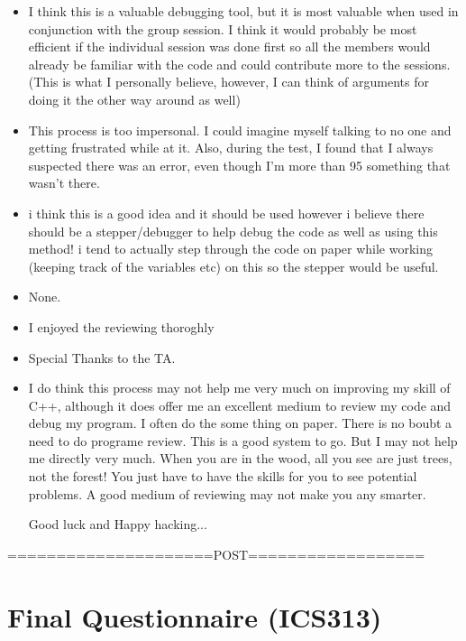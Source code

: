\begin{enumerate}
\begin{itemize}
\item I think this is a valuable debugging tool, but it is most valuable
when used in conjunction with the group session.  I think it would
probably be most efficient if the individual session was done first so
all the members would already be familiar with the code and could
contribute more to the sessions. (This is what I personally believe,
however, I can think of arguments for doing it the other way around as well)
\item This process is too impersonal.  I could imagine myself talking to no
one and getting frustrated while at it.  Also, during the test, I
found that I always suspected there was an error, even though I'm more
than 95%
something that wasn't there.
\item i think this is a good idea and it should be used however i believe
there should be a stepper/debugger to help debug the code as well
as using this method! i tend to actually step through the code on
paper while working (keeping track of the variables etc)
on this so the stepper would be useful.


\item None.
\item I enjoyed the reviewing thoroghly
\item Special Thanks to the TA.
\item I do think this process may not help me very much on improving my skill of
C++, although it does offer me an excellent medium to review my code
and debug my program.  I often do the some thing on paper.  There is
no boubt a need to do programe review.  This is a good system to go.
But I may not help me directly very much.  When you are in the wood,
all you see are just trees, not the forest!  You just have to have the
skills for you to see potential problems.  A good medium of reviewing
may not make you any smarter.

Good luck and Happy hacking...

\end{itemize}


\end{enumerate}

=====================POST==================

\chapter {Final Questionnaire (ICS313) }

